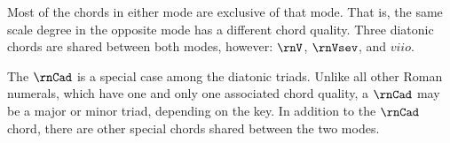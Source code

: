 
Most of the chords in either mode are exclusive of that
mode. That is, the same scale degree in the opposite mode
has a different chord quality. Three diatonic chords are
shared between both modes, however: $\rnV$, $\rnVsev$, and
$viio$. 

The $\rnCad$ is a special case among the diatonic triads.
Unlike all other Roman numerals, which have one and only one
associated chord quality, a $\rnCad$ may be a major or minor
triad, depending on the key. In addition to the $\rnCad$
chord, there are other special chords shared between the two
modes.

